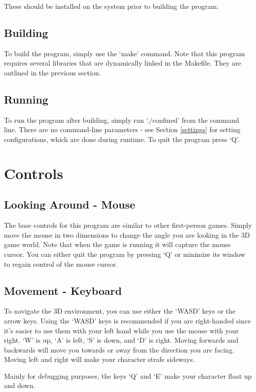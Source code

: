 \documentclass[oneside]{book}
\begin{document}
      These should be installed on the system prior to building the program.

    \subsection{Building}
      To build the program, simply use the `make' command.
      Note that this program requires several libraries that are dynamically linked in the Makefile. They are outlined in the previous section.

    \subsection{Running}
      To run the program after building, simply run `./confined' from the command line.
      There are no command-line parameters - see Section \ref{settings} for setting configurations, which are done during runtime.
      To quit the program press `Q'.

  \section{Controls}
    \subsection{Looking Around - Mouse}
      The base controls for this program are similar to other first-person games.
      Simply move the mouse in two dimensions to change the angle you are looking in the 3D game world.
      Note that when the game is running it will capture the mouse cursor. You can either quit the program by pressing `Q' or minimize its window to regain control of the mouse cursor.

    \subsection{Movement - Keyboard}
      To navigate the 3D environment, you can use either the `WASD' keys or the arrow keys. Using the `WASD' keys is recommended if you are right-handed since it's easier to use them with your left hand while you use the mouse with your right. `W' is up, `A' is left, `S' is down, and `D' is right. Moving forwards and backwards will move you towards or away from the direction you are facing. Moving left and right will make your character strafe sideways.

      Mainly for debugging purposes, the keys `Q' and `E' make your character float up and down.
\end{document}
